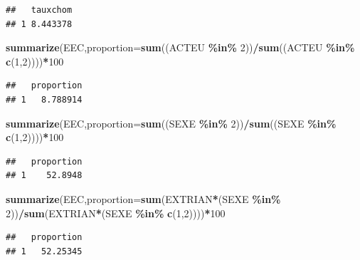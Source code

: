 \documentclass[
]{book}
\newenvironment{Shaded}{\begin{snugshade}}{\end{snugshade}}
\newcommand{\AttributeTok}[1]{\textcolor[rgb]{0.13,0.29,0.53}{#1}}
\newcommand{\DecValTok}[1]{\textcolor[rgb]{0.00,0.00,0.81}{#1}}
\newcommand{\FunctionTok}[1]{\textcolor[rgb]{0.13,0.29,0.53}{\textbf{#1}}}
\newcommand{\NormalTok}[1]{#1}
\newcommand{\SpecialCharTok}[1]{\textcolor[rgb]{0.81,0.36,0.00}{\textbf{#1}}}
\begin{document}
\begin{verbatim}
##   tauxchom
## 1 8.443378
\end{verbatim}

\begin{Shaded}
\begin{Highlighting}[]
\FunctionTok{summarize}\NormalTok{(EEC,}\AttributeTok{proportion=}\FunctionTok{sum}\NormalTok{((ACTEU }\SpecialCharTok{\%in\%} \DecValTok{2}\NormalTok{))}\SpecialCharTok{/}\FunctionTok{sum}\NormalTok{((ACTEU }\SpecialCharTok{\%in\%} \FunctionTok{c}\NormalTok{(}\DecValTok{1}\NormalTok{,}\DecValTok{2}\NormalTok{))))}\SpecialCharTok{*}\DecValTok{100}
\end{Highlighting}
\end{Shaded}

\begin{verbatim}
##   proportion
## 1   8.788914
\end{verbatim}

\begin{Shaded}
\begin{Highlighting}[]
\FunctionTok{summarize}\NormalTok{(EEC,}\AttributeTok{proportion=}\FunctionTok{sum}\NormalTok{((SEXE }\SpecialCharTok{\%in\%} \DecValTok{2}\NormalTok{))}\SpecialCharTok{/}\FunctionTok{sum}\NormalTok{((SEXE }\SpecialCharTok{\%in\%} \FunctionTok{c}\NormalTok{(}\DecValTok{1}\NormalTok{,}\DecValTok{2}\NormalTok{))))}\SpecialCharTok{*}\DecValTok{100}
\end{Highlighting}
\end{Shaded}

\begin{verbatim}
##   proportion
## 1    52.8948
\end{verbatim}

\begin{Shaded}
\begin{Highlighting}[]
\FunctionTok{summarize}\NormalTok{(EEC,}\AttributeTok{proportion=}\FunctionTok{sum}\NormalTok{(EXTRIAN}\SpecialCharTok{*}\NormalTok{(SEXE }\SpecialCharTok{\%in\%} \DecValTok{2}\NormalTok{))}\SpecialCharTok{/}\FunctionTok{sum}\NormalTok{(EXTRIAN}\SpecialCharTok{*}\NormalTok{(SEXE }\SpecialCharTok{\%in\%} \FunctionTok{c}\NormalTok{(}\DecValTok{1}\NormalTok{,}\DecValTok{2}\NormalTok{))))}\SpecialCharTok{*}\DecValTok{100}
\end{Highlighting}
\end{Shaded}

\begin{verbatim}
##   proportion
## 1   52.25345
\end{verbatim}
\end{document}
